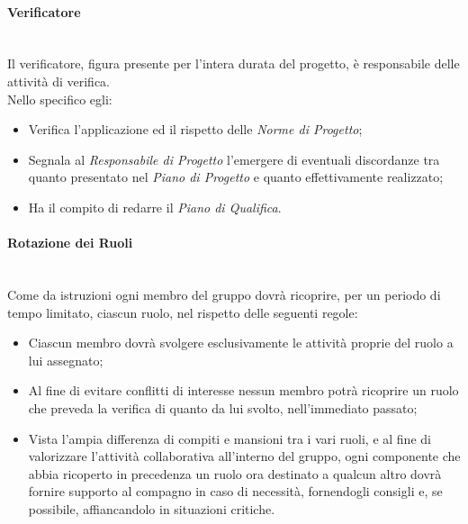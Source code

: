 \paragraph{Verificatore} ~\\
	Il verificatore, figura presente per l'intera durata del progetto, è responsabile delle attività di 				verifica.\\
	Nello specifico egli:
	\begin{itemize}
	\item Verifica l'applicazione ed il rispetto delle \textit{Norme di Progetto};
	\item Segnala al \textit{Responsabile di Progetto} l'emergere di eventuali discordanze tra quanto presentato nel 			\textit{Piano di Progetto} e quanto effettivamente realizzato;
	\item Ha il compito di redarre il \textit{Piano di Qualifica}.
	\end{itemize}

\paragraph{Rotazione dei Ruoli} ~\\
	Come da istruzioni ogni membro del gruppo dovrà ricoprire, per un periodo di tempo limitato, ciascun ruolo, nel 			rispetto delle seguenti regole:
	\begin{itemize}
	\item Ciascun membro dovrà svolgere esclusivamente le attività proprie del ruolo a lui assegnato;
	\item Al fine di evitare conflitti di interesse nessun membro potrà ricoprire un ruolo che preveda la 									verifica di quanto da lui svolto, nell'immediato passato;
	\item Vista l'ampia differenza di compiti e mansioni tra i vari ruoli, e al fine di valorizzare l'attività 						collaborativa all'interno del gruppo, ogni componente che abbia ricoperto in precedenza un ruolo ora destinato 			a qualcun altro dovrà fornire supporto al compagno in caso di necessità, fornendogli consigli e, se possibile, 			affiancandolo in situazioni critiche.
	\end{itemize}
